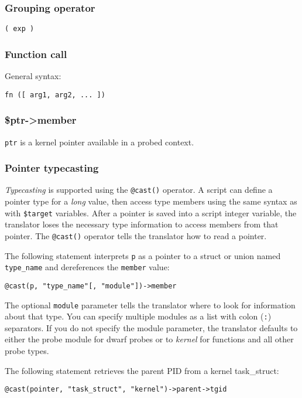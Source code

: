\documentclass[twoside,english]{article}
\newenvironment{vindent}
{\begin{list}{}{\setlength{\listparindent}{6pt}}
\item[]}
{\end{list}}
\begin{document}
\subsubsection{Grouping operator}
\texttt{( exp )}


\subsubsection{Function call}
General syntax:

\texttt{fn ({[} arg1, arg2, ... ])}


\subsubsection{\$ptr-\textgreater member}
\texttt{ptr} is a kernel pointer available in a probed context.


\subsubsection{Pointer typecasting}

\emph{Typecasting} is supported using the \texttt{@cast()} operator. A
script can define a pointer type for a \emph{long} value, then access
type members using the same syntax as with \texttt{\$target}
variables. After a pointer is saved into a script integer variable,
the translator loses the necessary type information to access members
from that pointer.  The \texttt{@cast()} operator tells the translator
how to read a pointer.

The following statement interprets \texttt{p} as a pointer to a struct
or union named \texttt{type\_name} and dereferences the
\texttt{member} value:
\begin{vindent}
\begin{verbatim}
@cast(p, "type_name"[, "module"])->member
\end{verbatim}
\end{vindent}

The optional \texttt{module} parameter tells the translator where to
look for information about that type. You can specify multiple modules
as a list with colon (\texttt{:}) separators. If you do not specify
the module parameter, the translator defaults to either the probe
module for dwarf probes or to \textit{kernel} for functions and all
other probe types.

The following statement retrieves the parent PID from a kernel
task\_struct:
\begin{vindent}
\begin{verbatim}
@cast(pointer, "task_struct", "kernel")->parent->tgid
\end{verbatim}
\end{vindent}
\end{document}
